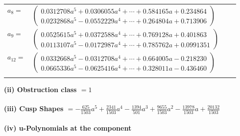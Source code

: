 \documentclass[1p]{elsarticle_modified}
\theoremstyle{definition}
\begin{document}
\begin{tabular}{m{7pt} m{180pt} m{7pt} m{180pt} }
\flushright $a_{8}=$&$\begin{pmatrix}0.0312708 a^{5}+0.0306055 a^{4}+\cdots+0.584165 a+0.234864\\0.0232868 a^{5}-0.0552229 a^{4}+\cdots+0.264804 a+0.713906\end{pmatrix}$ \\
\flushright $a_{9}=$&$\begin{pmatrix}0.0525615 a^{5}+0.0372588 a^{4}+\cdots+0.769128 a+0.401863\\0.0113107 a^{5}-0.0172987 a^{4}+\cdots+0.785762 a+0.0991351\end{pmatrix}$ \\
\flushright $a_{12}=$&$\begin{pmatrix}0.0332668 a^{5}-0.0312708 a^{4}+\cdots+0.664005 a-0.218230\\0.0665336 a^{5}-0.0625416 a^{4}+\cdots+0.328011 a-0.436460\end{pmatrix}$\\&\end{tabular}
\flushleft \textbf{(ii) Obstruction class $= 1$}\\~\\
\flushleft \textbf{(iii) Cusp Shapes $= -\frac{625}{1503} a^5+\frac{2341}{1503} a^4-\frac{1394}{501} a^3+\frac{9655}{1503} a^2-\frac{13978}{1503} a+\frac{20132}{1503}$}\\~\\
\newpage\renewcommand{\arraystretch}{1}
\flushleft \textbf{(iv) u-Polynomials at the component}\newline \\
\end{document}
